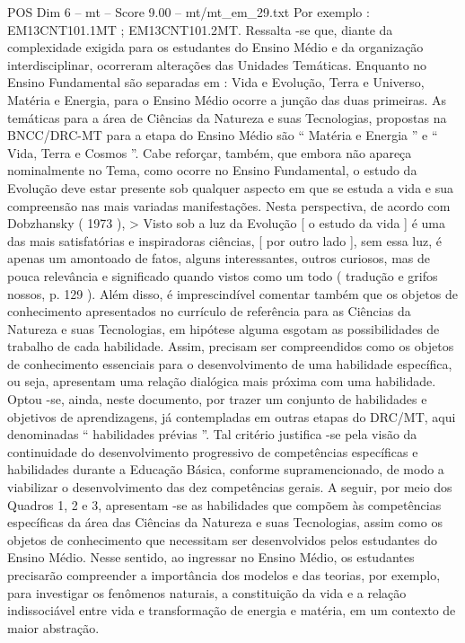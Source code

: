 \begin{textsample}{POS Dim 6 – mt – Score 9.00 – mt/mt\_em\_29.txt}
Por exemplo : EM13CNT101.1MT ; EM13CNT101.2MT.
Ressalta -se que, diante da complexidade exigida para os estudantes do Ensino Médio e da organização interdisciplinar, ocorreram alterações das Unidades Temáticas.
Enquanto no Ensino Fundamental são separadas em : Vida e Evolução, Terra e Universo, Matéria e Energia, para o Ensino Médio ocorre a junção das duas primeiras.
As temáticas para a área de Ciências da Natureza e suas Tecnologias, propostas na BNCC/DRC-MT para a etapa do Ensino Médio são “ Matéria e Energia ” e “ Vida, Terra e Cosmos ”.
Cabe reforçar, também, que embora não apareça nominalmente no Tema, como ocorre no Ensino Fundamental, o estudo da Evolução deve estar presente sob qualquer aspecto em que se estuda a vida e sua compreensão nas mais variadas manifestações.
Nesta perspectiva, de acordo com Dobzhansky ( 1973 ), > Visto sob a luz da Evolução [ o estudo da vida ] é uma das mais satisfatórias e inspiradoras ciências, [ por outro lado ], sem essa luz, é apenas um amontoado de fatos, alguns interessantes, outros curiosos, mas de pouca relevância e significado quando vistos como um todo ( tradução e grifos nossos, p. 129 ).
Além disso, é imprescindível comentar também que os objetos de conhecimento apresentados no currículo de referência para as Ciências da Natureza e suas Tecnologias, em hipótese alguma esgotam as possibilidades de trabalho de cada habilidade.
Assim, precisam ser compreendidos como os objetos de conhecimento essenciais para o desenvolvimento de uma habilidade específica, ou seja, apresentam uma relação dialógica mais próxima com uma habilidade.
Optou -se, ainda, neste documento, por trazer um conjunto de habilidades e objetivos de aprendizagens, já contempladas em outras etapas do DRC/MT, aqui denominadas “ habilidades prévias ”.
Tal critério justifica -se pela visão da continuidade do desenvolvimento progressivo de competências específicas e habilidades durante a Educação Básica, conforme supramencionado, de modo a viabilizar o desenvolvimento das dez competências gerais.
A seguir, por meio dos Quadros 1, 2 e 3, apresentam -se as habilidades que compõem às competências específicas da área das Ciências da Natureza e suas Tecnologias, assim como os objetos de conhecimento que necessitam ser desenvolvidos pelos estudantes do Ensino Médio.
Nesse sentido, ao ingressar no Ensino Médio, os estudantes precisarão compreender a importância dos modelos e das teorias, por exemplo, para investigar os fenômenos naturais, a constituição da vida e a relação indissociável entre vida e transformação de energia e matéria, em um contexto de maior abstração.

\end{textsample}
